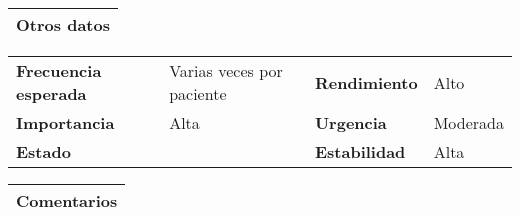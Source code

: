 \documentclass[11pt,a4paper]{article}
\begin{document}
\begin{table}[H]
	\begin{tabularx}{\textwidth}{X}
		\textbf{Otros datos}\\ \hline
	\end{tabularx}
	\begin{tabularx}{\textwidth}{lXlX}
		\textbf{Frecuencia esperada} & Varias veces por paciente & \textbf{Rendimiento} & Alto\\
		\textbf{Importancia} & Alta & \textbf{Urgencia} & Moderada\\
		\textbf{Estado} &  & \textbf{Estabilidad} & Alta\\
	\end{tabularx}
	
	\begin{tabularx}{\textwidth}{X}
		\textbf{Comentarios}\\ \hline
	\end{tabularx}
\end{table}


\end{document}
